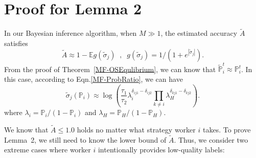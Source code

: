 \documentclass{article}
\begin{document}
\section{Proof for Lemma 2}
In our Bayesian inference algorithm, when $M\gg 1$, the estimated accuracy $\tilde{A}$ satisfies
\begin{equation}
\label{accP}
\tilde{A} \approx 1-\mathbb{E}g(\tilde{\sigma}_j)\;\;,\;\; g(\tilde{\sigma}_j)=1/(1+e^{|\tilde{\sigma}_j|}).
\end{equation}
From the proof of Theorem~\ref{MF-OSEqulibrium}, we can know that $\tilde{\mathbb{P}}^{t}_i \approx \mathbb{P}^{t}_i$.
In this case, according to Eqn.\ref{MF-ProbRatio}, we can have
\begin{equation}
\label{ProbRatioApp}
\tilde{\sigma}_j(\mathbb{P}_i)\approx \log\left(\frac{\tau_{1}}{\tau_{2}}\lambda_i^{\delta_{ij1}-\delta_{ij2}}{\prod}_{k\neq i}\lambda_H^{\delta_{kj1}-\delta_{kj2}}\right).
\end{equation}
where $\lambda_i=\mathbb{P}_i/(1-\mathbb{P}_i)$ and $\lambda_H=\mathbb{P}_H/(1-\mathbb{P}_H)$.

We know that $\tilde{A}\leq 1.0$ holds no matter what strategy worker $i$ takes. To prove Lemma~2, we still need to know the lower bound of $\tilde{A}$. Thus, we consider two extreme cases where worker $i$ intentionally provides low-quality labels:
\end{document}
